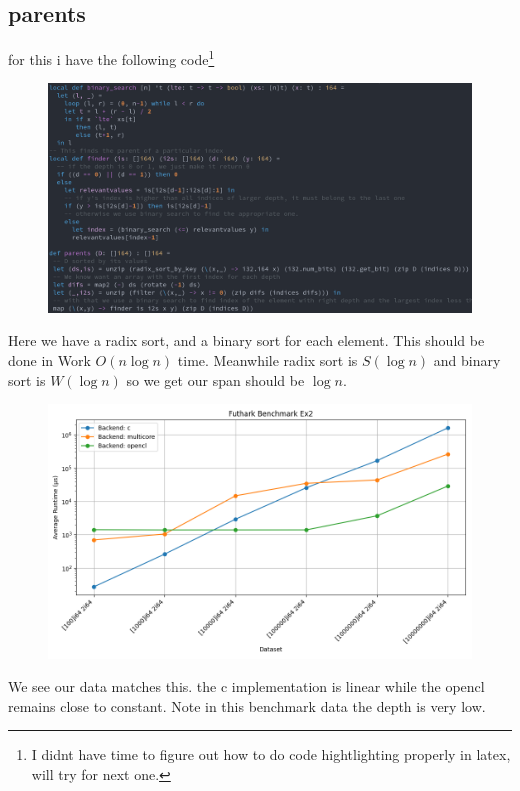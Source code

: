 \documentclass[a4paper,12pt]{article}
\begin{document}
\subsection{parents}
for this i have the following code\footnote{I didnt have time to figure out
	how to do code hightlighting properly in latex, will try for next one.}
\begin{figure}[H]
	\centering
	\includegraphics[width=\linewidth]{Ex2.png}
	\caption{}
	\label{fig:}
\end{figure}
Here we have a radix sort, and a binary sort for each element. This should
be done in Work \(O(n \log n)\) time. Meanwhile radix sort is \(S(\log n)\)
and binary sort is \(W(\log n)\)
so we get our span should be \(\log n\).
\begin{figure}[H]
	\centering
	\includegraphics[width=\linewidth]{Ex2benchmark_results.png}
\end{figure}
We see our data matches this. the c implementation is linear while the
opencl remains close to constant. Note in this benchmark data the depth is
very low.
\end{document}
